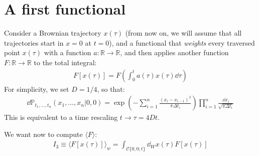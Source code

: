 \documentclass[../template.tex]{subfiles}
\begin{document}
\section{A first functional}
Consider a Brownian trajectory $x(\tau)$ (from now on, we will assume that all trajectories start in $x=0$ at $t = 0$), and a functional that \textit{weights} every traversed point $x(\tau)$ with a function $a\colon \mathbb{R} \to \mathbb{R}$, and then applies another function $F\colon \mathbb{R} \to \mathbb{R}$ to the total integral:
\begin{align*}
    F[x(\tau)] = F\left(\int_0^t a(\tau) x(\tau) \dd{\tau}\right)
\end{align*}    
For simplicity, we set $D = 1/4$, so that:
\begin{align*}
    \dd{\mathbb{P}}_{t_1,\dots,t_n} (x_1,\dots,x_n|0,0) = \exp\left(-\sum_{i=1}^n \frac{(x_i - x_{i-1})^2}{\pi \Delta t_i} \right) \prod_{i=1}^n \frac{\dd{x_i}}{\sqrt{\pi \Delta t_i}} 
\end{align*} 
This is equivalent to a time rescaling $t \to \tau = 4Dt$.

We want now to compute $\langle F \rangle$:
\begin{align*}
    I_3 \equiv \langle F[x(\tau)] \rangle_w = \int_{\mathcal{C}\{0,0;t\}} \dd{_Wx(\tau)} F[x(\tau)]
\end{align*}
\end{document}
